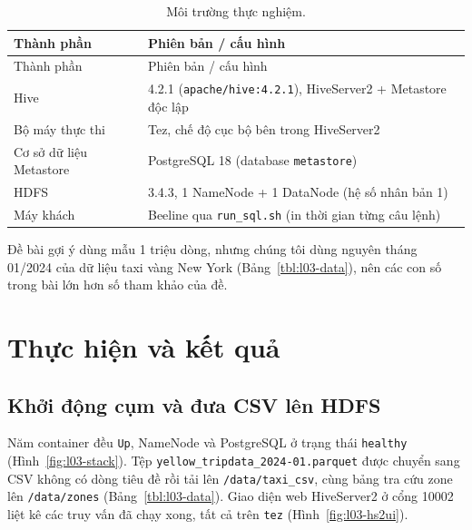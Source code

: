 \documentclass[
  12pt,
  a4paper,
]{report}
\begin{document}
\begin{longtable}[]{@{}ll@{}}
\caption{\label{tbl:l03-env}Môi trường thực nghiệm.}\tabularnewline
\toprule\noalign{}
Thành phần & Phiên bản / cấu hình \\
\midrule\noalign{}
\endfirsthead
\toprule\noalign{}
Thành phần & Phiên bản / cấu hình \\
\midrule\noalign{}
\endhead
\bottomrule\noalign{}
\endlastfoot
Hive & 4.2.1
(\texttt{apache/}\allowbreak{}\texttt{hive:}\allowbreak{}\texttt{4.}\allowbreak{}\texttt{2.}\allowbreak{}\texttt{1}\allowbreak{}),
HiveServer2 + Metastore độc lập \\
Bộ máy thực thi & Tez, chế độ cục bộ bên trong HiveServer2 \\
Cơ sở dữ liệu Metastore & PostgreSQL 18 (database \texttt{metastore}) \\
HDFS & 3.4.3, 1 NameNode + 1 DataNode (hệ số nhân bản 1) \\
Máy khách & Beeline qua \texttt{run\_sql.sh} (in thời gian từng câu
lệnh) \\
\end{longtable}

Đề bài gợi ý dùng mẫu 1 triệu dòng, nhưng chúng tôi dùng nguyên tháng
01/2024 của dữ liệu taxi vàng New York (Bảng~\ref{tbl:l03-data}), nên
các con số trong bài lớn hơn số tham khảo của đề.

\section{Thực hiện và kết quả}\label{sec:l03-results}

\subsection{Khởi động cụm và đưa CSV lên HDFS}\label{sec:l03-res-stack}

Năm container đều \texttt{Up}, NameNode và PostgreSQL ở trạng thái
\texttt{healthy} (Hình~\ref{fig:l03-stack}). Tệp
\texttt{yellow\_}\allowbreak{}\texttt{tripdata\_}\allowbreak{}\texttt{2024-01.}\allowbreak{}\texttt{parquet}\allowbreak{}
được chuyển sang CSV không có dòng tiêu đề rồi tải lên
\texttt{/data/taxi\_csv}, cùng bảng tra cứu zone lên
\texttt{/data/zones} (Bảng~\ref{tbl:l03-data}). Giao diện web
HiveServer2 ở cổng 10002 liệt kê các truy vấn đã chạy xong, tất cả trên
\texttt{tez} (Hình~\ref{fig:l03-hs2ui}).
\end{document}
